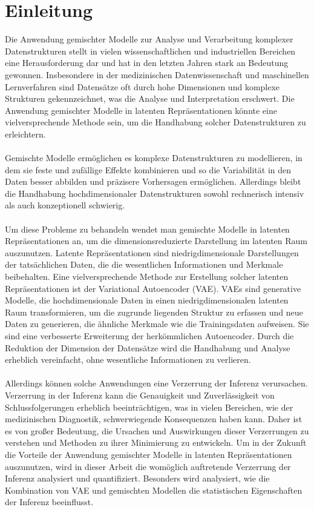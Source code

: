 \documentclass[%
thesis=student,%
coverpage=false,%
titlepage=false,%
headmarks=true, %
german,%
font=libertine, %
math=newpxtx, %
BCOR=5mm,%
coverBCOR=11mm%
]{tumbook}
\theoremstyle{break}
\begin{document}
\chapter{Einleitung}
Die Anwendung gemischter Modelle zur Analyse und Verarbeitung komplexer Datenstrukturen stellt in vielen wissenschaftlichen und industriellen Bereichen eine Herausforderung dar und hat in den letzten Jahren stark an Bedeutung gewonnen. Insbesondere in der medizinischen Datenwissenschaft und maschinellen Lernverfahren sind Datensätze oft durch hohe Dimensionen und komplexe Strukturen gekennzeichnet, was die Analyse und Interpretation erschwert. Die Anwendung gemischter Modelle in latenten Repräsentationen könnte eine vielversprechende Methode sein, um die Handhabung solcher Datenstrukturen zu erleichtern.\\
\\
Gemischte Modelle ermöglichen 
es komplexe Datenstrukturen zu modellieren, in dem sie feste und zufällige Effekte kombinieren und so die Variabilität in den Daten besser abbilden und präzisere Vorhersagen ermöglichen. Allerdings bleibt die Handhabung hochdimensionaler Datenstrukturen sowohl rechnerisch intensiv als auch konzeptionell schwierig.\\
\\
Um diese Probleme zu behandeln wendet man gemischte Modelle  in latenten Repräsentationen an, um die dimensionsreduzierte Darstellung im latenten Raum auszunutzen. Latente Repräsentationen sind niedrigdimensionale Darstellungen der tatsächlichen Daten, die die wesentlichen Informationen und Merkmale beibehalten. Eine vielversprechende Methode zur Erstellung solcher latenten Repräsentationen ist der Variational Autoencoder (VAE). VAEs sind generative Modelle, die hochdimensionale Daten in einen niedrigdimensionalen latenten Raum transformieren, um die zugrunde liegenden Struktur zu erfassen und neue Daten zu generieren, die ähnliche Merkmale wie die Trainingsdaten aufweisen. Sie sind eine verbesserte Erweiterung der herkömmlichen Autoencoder. Durch die Reduktion der Dimension der Datensätze wird die Handhabung und Analyse erheblich vereinfacht, ohne wesentliche Informationen zu verlieren. \\
\\
Allerdings können solche Anwendungen eine Verzerrung der Inferenz verursachen.
Verzerrung in der Inferenz kann die Genauigkeit und Zuverlässigkeit von Schlussfolgerungen erheblich beeinträchtigen, was in vielen Bereichen, wie der medizinischen Diagnostik, schwerwiegende Konsequenzen haben kann. Daher ist es von großer Bedeutung, die Ursachen und Auswirkungen dieser Verzerrungen zu verstehen und Methoden zu ihrer Minimierung zu entwickeln. Um in der Zukunft die Vorteile der Anwendung gemischter Modelle in latenten Repräsentationen auszunutzen, wird in dieser Arbeit die womöglich auftretende Verzerrung der Inferenz analysiert und quantifiziert. Besonders wird analysiert, wie die Kombination von VAE und gemischten Modellen die statistischen Eigenschaften der Inferenz beeinflusst. \\
\end{document}
